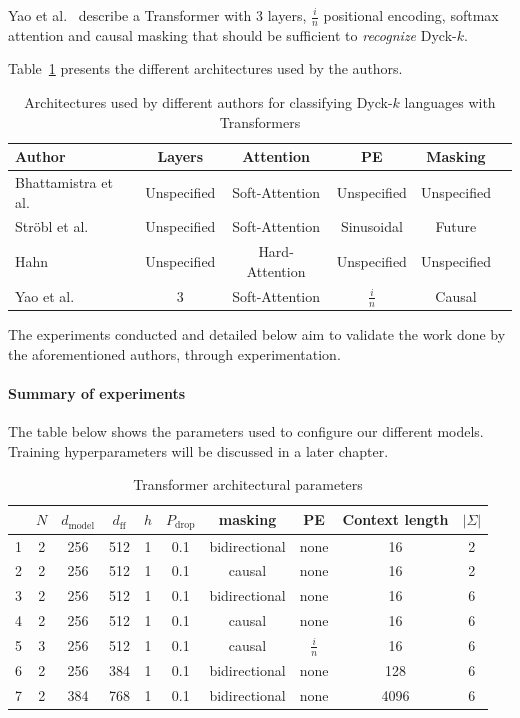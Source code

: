 Yao et al.~\cite{bounded-hierarchical-languages} describe a Transformer with 3 layers, $\frac{i}{n}$ positional encoding, softmax attention and causal masking that should be sufficient to \emph{recognize} Dyck-$k$.

Table~\ref{table:author-experiments} presents the different architectures used by the authors.

\begin{table}[ht]
\centering
\begin{tabular}{l || c c c c c}
\toprule
\textbf{Author} & \textbf{Layers} & \textbf{Attention} & \textbf{PE} & \textbf{Masking} \\
\midrule
Bhattamistra et al. & Unspecified & Soft-Attention & Unspecified & Unspecified \\
Ströbl et al. & Unspecified & Soft-Attention & Sinusoidal & Future \\
Hahn & Unspecified & Hard-Attention & Unspecified & Unspecified \\
Yao et al. & 3 & Soft-Attention & $\frac{i}{n}$ & Causal \\
\bottomrule
\end{tabular}
\caption{Architectures used by different authors for classifying Dyck-$k$ languages with Transformers}
\label{table:author-experiments}
\end{table}


The experiments conducted and detailed below aim to validate the work done by the aforementioned authors, through experimentation.

\paragraph{Summary of experiments}
The table below shows the parameters used to configure our different models. Training hyperparameters will be discussed in a later chapter. 

\begin{table}[h!]
\centering
\begin{tabular}{c || c c c c c c c c c}
\toprule
 &$N$ & $d_{\text{model}}$ & $d_{\text{ff}}$ & $h$ & $P_{\text{drop}}$ & masking & PE & Context length & $|\Sigma|$  \\
\midrule
1 & 2 & 256 & 512 & 1 & 0.1 & bidirectional & none & 16 & 2 \\
2 & 2 & 256 & 512 & 1 & 0.1 & causal & none & 16 & 2 \\
3 & 2 & 256 & 512 & 1 & 0.1 & bidirectional & none & 16 & 6 \\
4 & 2 & 256 & 512 & 1 & 0.1 & causal & none & 16 & 6 \\
5 & 3 & 256 & 512 & 1 & 0.1 & causal & $\frac{i}{n}$ & 16 & 6 \\
6 & 2 & 256 & 384 & 1 & 0.1 & bidirectional & none & 128 & 6 \\
7 & 2 & 384 & 768 & 1 & 0.1 & bidirectional & none & 4096 & 6 \\
\bottomrule
\end{tabular}
\caption{Transformer architectural parameters}
\label{table:transformer_model_archs}
\end{table}

